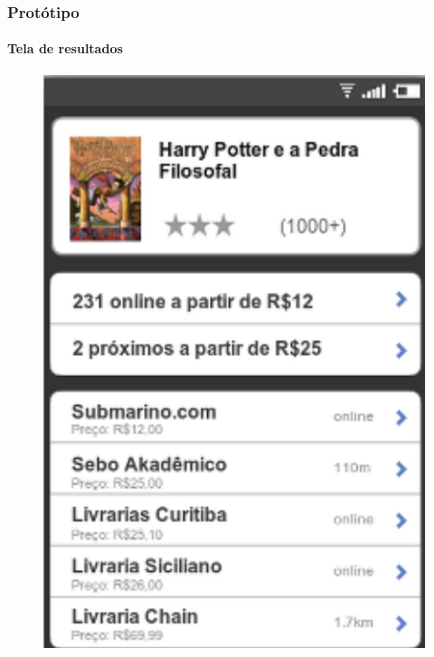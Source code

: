 \documentclass[14pt,beamer]{beamer}
\begin{document}
\begin{frame}
	\frametitle{Protótipo}
	\framesubtitle{Tela de resultados}

    \begin{figure}
        \centering
        \includegraphics[scale=.71]{tela/Tela}
    \end{figure}
\end{frame}
\end{document}
